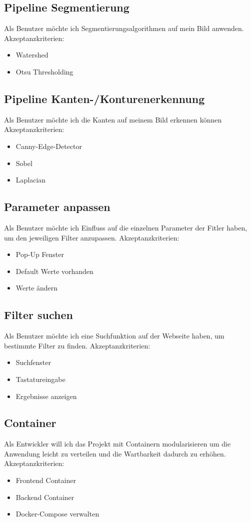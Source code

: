 \documentclass[conference]{IEEEtran}
\begin{document}
\subsection{Pipeline Segmentierung}
Als Benutzer möchte ich Segmentierungsalgorithmen auf mein Bild anwenden.
Akzeptanzkriterien:
\begin{itemize}
	\item Watershed
	\item Otsu Thresholding
\end{itemize}

\subsection{Pipeline Kanten-/Konturenerkennung}
Als Benutzer möchte ich die Kanten auf meinem Bild erkennen können
Akzeptanzkriterien:
\begin{itemize}
	\item Canny-Edge-Detector
	\item Sobel
	\item Laplacian
\end{itemize}

\subsection{Parameter anpassen}
Als Benutzer möchte ich Einfluss auf die einzelnen Parameter der Fitler haben, um den jeweiligen Filter anzupassen.
Akzeptanzkriterien: 
\begin{itemize}
	\item Pop-Up Fenster
	\item Default Werte vorhanden
	\item Werte ändern
\end{itemize}

\subsection{Filter suchen}
Als Benutzer möchte ich eine Suchfunktion auf der Webseite haben, um bestimmte Filter zu finden. 
Akzeptanzkriterien: 
\begin{itemize}
	\item Suchfenster
	\item Tastatureingabe
	\item Ergebnisse anzeigen
\end{itemize}

\subsection{Container}
Als Entwickler will ich das Projekt mit Containern modularisieren um die Anwendung leicht zu verteilen und die Wartbarkeit dadurch zu erhöhen.
Akzeptanzkriterien: 
\begin{itemize}
	\item Frontend Container
	\item Backend Container
	\item Docker-Compose verwalten
\end{itemize}
\end{document}
